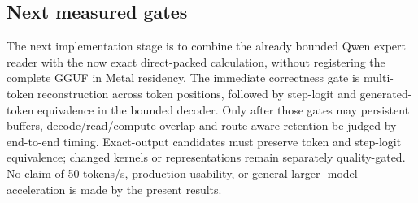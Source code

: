 \subsection{Next measured gates}

The next implementation stage is to combine the already bounded Qwen expert
reader with the now exact direct-packed calculation, without registering the
complete GGUF in Metal residency.  The immediate correctness gate is multi-token
reconstruction across token positions, followed by step-logit and generated-token
equivalence in the bounded decoder.  Only after those gates may persistent
buffers, decode/read/compute overlap and route-aware retention be judged by
end-to-end timing.  Exact-output candidates must preserve token
and step-logit equivalence; changed kernels or representations remain separately
quality-gated.  No claim of 50 tokens/s, production usability, or general larger-
model acceleration is made by the present results.
